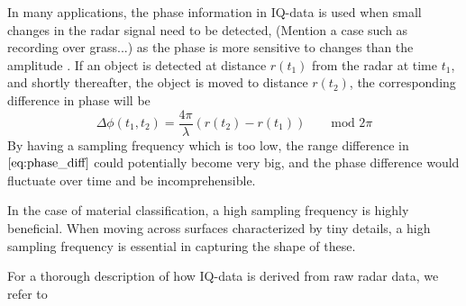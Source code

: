 In many applications, the phase information in IQ-data is used when small changes in the radar signal need to be detected, (Mention a case such as recording over grass...) as the phase is more sensitive to changes than the amplitude \citep{lien_gillian_karagozler_amihood_schwesig_olson_raja_poupyrev_2016}. If an object is detected at distance $r(t_1)$ from the radar at time $t_1$, and shortly thereafter, the object is moved to distance $r(t_2)$, the corresponding difference in phase will be
\begin{equation}
	\label{eq:phase_diff}
	\Delta\phi(t_1, t_2)=\frac{4\pi}{\lambda}(r(t_2)-r(t_1)) \quad\quad \textrm{mod 2$\pi$}
\end{equation}
By having a sampling frequency which is too low, the range difference in $\eqref{eq:phase_diff}$ could potentially become very big, and the phase difference would fluctuate over time and be incomprehensible.

In the case of material classification, a high sampling frequency is highly beneficial. When moving across surfaces characterized by tiny details, a high sampling frequency is essential in capturing the shape of these.

For a thorough description of how IQ-data is derived from raw radar data, we refer to \citep{richards_2014}


